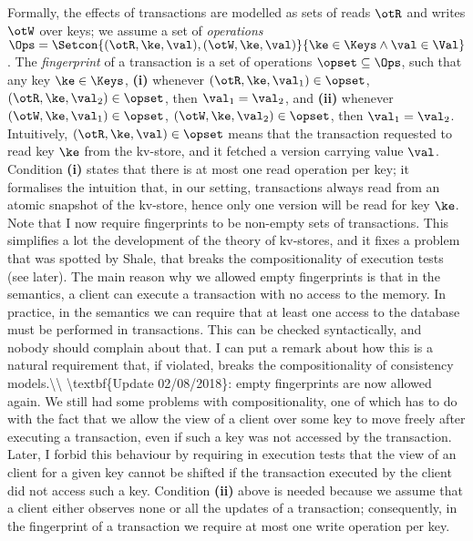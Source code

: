 Formally, the effects of transactions are modelled as sets of reads \( \otR \) and writes \( \otW \)
over keys; we assume a set of \emph{operations} $\Ops = \Setcon{(\otR, \ke, \val), (\otW, \ke, \val) }{ \ke \in \Keys \wedge 
\val \in \Val }$. The \emph{fingerprint} of a transaction is a set of operations $\opset \subseteq \Ops$, such that any key $\ke \in \Keys$,
\textbf{(i)} whenever $(\otR, \ke, \val_1) \in \opset$, $(\otR, \ke, \val_2) \in \opset$, then $\val_1 = \val_2$, 
and \textbf{(ii)} whenever $(\otW, \ke, \val_1) \in \opset$, $(\otW, \ke, \val_2) \in \opset$, then $\val_1 = \val_2$. 
Intuitively, $(\otR, \ke, \val) \in \opset$ means that the transaction requested to read key $\ke$ from the kv-store, 
and it fetched a version carrying value $\val$. Condition \textbf{(i)} states that there is at most one read operation per key; it  
formalises the intuition that, in our setting, 
transactions always read from an atomic snapshot of the kv-store, hence only one version will be read for key $\ke$. 
\ac{Note that I now require fingerprints to be non-empty sets of transactions. This simplifies a lot the development of 
the theory of kv-stores, and it fixes a problem that was spotted by Shale, that breaks the compositionality of 
execution tests (see later). The main reason why we allowed empty fingerprints is that in the semantics, a client can 
execute a transaction with no access to the memory. In practice, in the semantics we can require that at least 
one access to the database must be performed in transactions. This can be checked syntactically, and nobody 
should complain about that. I can put a remark about how this is a natural requirement that, if violated, 
breaks the compositionality of consistency models.\\ 
\textbf{Update 02/08/2018}: empty fingerprints are now allowed again. We still had some problems with compositionality, 
one of which has to do with the fact that we allow the view of a client over some key to move freely after executing a transaction, 
even if such a key was not accessed by the transaction. Later, I forbid this behaviour by requiring in execution tests that the 
view of an client for a given key cannot be shifted if the transaction executed by the client did not access such a key.}
Condition \textbf{(ii)} above is needed because we assume that a client either observes none or all the updates 
of a transaction; consequently, in the fingerprint of a transaction we require at most one write operation per key. 

